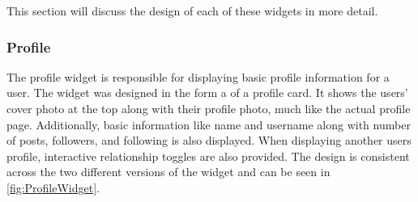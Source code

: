 This section will discuss the design of each of these widgets in more detail.

\subsubsection{Profile}
The profile widget is responsible for displaying basic profile information for a user. The widget was designed in the form a of a profile card. It shows the users' cover photo at the top along with their profile photo, much like the actual profile page. Additionally, basic information like name and username along with number of posts, followers, and following is also displayed. When displaying another users profile, interactive relationship toggles are also provided. The design is consistent across the two different versions of the widget and can be seen in \ref{fig:ProfileWidget}.

